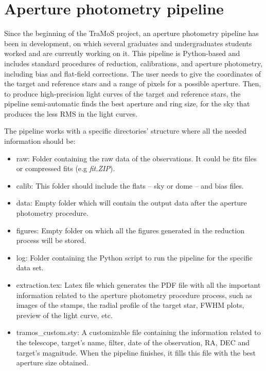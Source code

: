 \chapter{Aperture photometry pipeline}\label{chap:pipeline}

Since the beginning of the TraMoS project, an aperture photometry pipeline has been in development, on which several graduates and undergraduates students worked and are currently working on it. This pipeline is Python-based and includes standard procedures of reduction, calibrations, and aperture photometry, including bias and flat-field corrections. The user needs to give the coordinates of the target and reference stars and a range of pixels for a possible aperture. Then, to produce high-precision light curves of the target and reference stars, the pipeline semi-automatic finds the best aperture and ring size, for the sky that produces the less RMS in the light curves. 

The pipeline works with a specific directories' structure where all the needed information should be:
\begin{itemize}
\item raw: Folder containing the raw data of the observations. It could be fits files or compressed fits (e.g \textit{fit.ZIP}).
\item calib: This folder should include the flats -- sky or dome -- and bias files.
\item data: Empty folder which will contain the output data after the aperture photometry procedure.
\item figures: Empty folder on which all the figures generated in the reduction process will be stored.
\item log: Folder containing the Python script to run the pipeline for the specific data set.
\item extraction.tex: Latex file which generates the PDF file with all the important information related to the aperture photometry procedure process, such as images of the stamps, the radial profile of the target star, FWHM plots, preview of the light curve, etc.
\item tramos\_custom.sty: A customizable file containing the information related to the telescope, target's name, filter, date of the observation, RA, DEC and target's magnitude. When the pipeline finishes, it fills this file with the best aperture size obtained.
\end{itemize}

